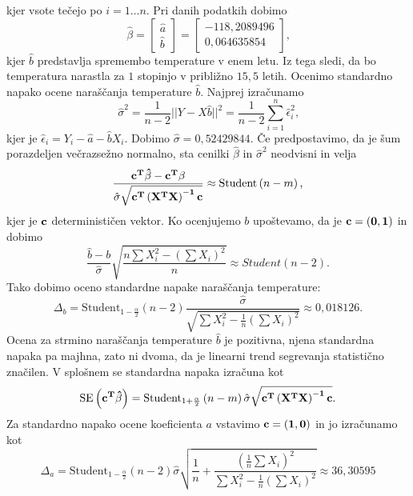 \documentclass{article}
\begin{document}
kjer vsote tečejo po $i = 1 \dots n$.
Pri danih podatkih dobimo
\begin{equation*}
    \hat{\beta} = 
    \begin{bmatrix}
        \hat{a}\\ \hat{b}
    \end{bmatrix}
    = 
    \begin{bmatrix}
        - 118{,}2089496 \\
        0{,}064635854
    \end{bmatrix}\text{,}
\end{equation*}
kjer $\hat{b}$ predstavlja spremembo temperature v enem letu. Iz tega sledi, da bo temperatura narastla
za $1$ stopinjo v približno $15{,}5$ letih. Ocenimo standardno napako ocene naraščanja temperature $\hat{b}$.
Najprej izračunamo 
$$ \hat{\sigma}^2 = \frac{1}{n - 2} || Y - X \hat{b} ||^2 = \frac{1}{n - 2} \sum_{i=1}^{n} \hat{\epsilon}_i^2 \text{,}$$
kjer je $\hat{\epsilon}_i = Y_i - \hat{a} - \hat{b} X_i$. Dobimo $\hat{\sigma} = 0{,}52429844$. 
Če predpostavimo, da je šum porazdeljen večrazsežno normalno, sta cenilki $\hat{\beta}$ in $\hat{\sigma}^2$ 
neodvisni in velja  
$$ \frac{\bf{c}^T \hat{\beta} - \bf{c}^T \beta}{\hat{\sigma} \sqrt{\bf{c}^T \left( \bf{X}^T \bf{X} \right)^{-1} \bf{c}}} \approx \text{Student} \left( n - m\right)\text{,}$$
kjer je $\bf{c}$ determinističen vektor. Ko ocenjujemo $b$ upoštevamo, da je $\bf{c} = \left( 0, 1 \right)$ in dobimo
$$ \frac{\hat{b} - b}{\hat{\sigma}} \sqrt{\frac{n \sum X_i^2 - \left( \sum X_i\right)^2}{n}} \approx Student(n-2) \text{.}$$
Tako dobimo oceno standardne napake naraščanja temperature:
\begin{equation}
    \label{SE b}
    \Delta_b = \text{Student}_{1 - \frac{\alpha}{2}} \left( n - 2 \right) \frac{\hat{\sigma}}{\sqrt{\sum X_i^2 - \frac{1}{n} \left( \sum X_i \right)^2}} \approx 0{,}018126 \text{.}
\end{equation}
Ocena za strmino naraščanja temperature $\hat{b}$ je pozitivna, njena standardna napaka pa majhna, zato ni dvoma, da 
je linearni trend segrevanja statistično značilen.
V splošnem se standardna napaka izračuna kot
$$\text{SE} \left(\bf{c}^T \hat{\beta} \right) = \text{Student}_{1 + \frac{\alpha}{2}} \left( n - m \right) \hat{\sigma} \sqrt{\bf{c}^T \left( \bf{X}^T \bf{X} \right)^{-1} \bf{c}} \text{.}$$
Za standardno napako ocene koeficienta $a$ vstavimo $\bf{c} = \left( 1, 0 \right)$ in jo izračunamo kot
\begin{equation}
    \label{SE a}
    \Delta_a = \text{Student}_{1 - \frac{\alpha}{2}} \left( n-2 \right) \hat{\sigma} \sqrt{\frac{1}{n} + \frac{\left(\frac{1}{n} \sum X_{i}\right)^2}{\sum X_{i}^2 - \frac{1}{n} \left( \sum X_{i}\right)^2}} \approx 36{,}30595
\end{equation}
\end{document}
